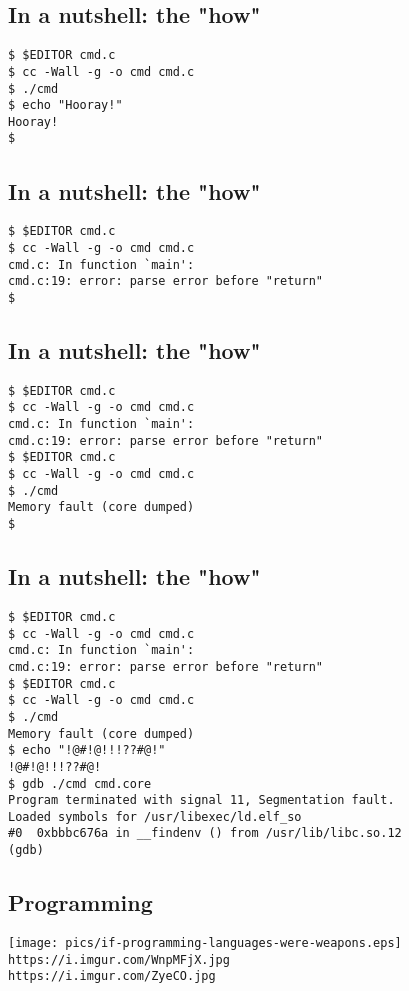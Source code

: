 \documentclass[sxga]{xdvislides}
\begin{document}
\subsection{In a nutshell: the "how"}
\begin{verbatim}
$ $EDITOR cmd.c
$ cc -Wall -g -o cmd cmd.c
$ ./cmd
$ echo "Hooray!"
Hooray!
$
\end{verbatim}

\subsection{In a nutshell: the "how"}
\begin{verbatim}
$ $EDITOR cmd.c
$ cc -Wall -g -o cmd cmd.c
cmd.c: In function `main':
cmd.c:19: error: parse error before "return"
$
\end{verbatim}

\subsection{In a nutshell: the "how"}
\begin{verbatim}
$ $EDITOR cmd.c
$ cc -Wall -g -o cmd cmd.c
cmd.c: In function `main':
cmd.c:19: error: parse error before "return"
$ $EDITOR cmd.c
$ cc -Wall -g -o cmd cmd.c
$ ./cmd
Memory fault (core dumped)
$
\end{verbatim}

\subsection{In a nutshell: the "how"}
\begin{verbatim}
$ $EDITOR cmd.c
$ cc -Wall -g -o cmd cmd.c
cmd.c: In function `main':
cmd.c:19: error: parse error before "return"
$ $EDITOR cmd.c
$ cc -Wall -g -o cmd cmd.c
$ ./cmd
Memory fault (core dumped)
$ echo "!@#!@!!!??#@!"
!@#!@!!!??#@!
$ gdb ./cmd cmd.core
Program terminated with signal 11, Segmentation fault.
Loaded symbols for /usr/libexec/ld.elf_so
#0  0xbbbc676a in __findenv () from /usr/lib/libc.so.12
(gdb)
\end{verbatim}

\subsection{Programming}
\begin{center}
\texttt{[image: pics/if-programming-languages-were-weapons.eps]} \\
\vspace{.5in}
\verb+https://i.imgur.com/WnpMFjX.jpg+ \\
\verb+https://i.imgur.com/ZyeCO.jpg+
\end{center}
\end{document}

